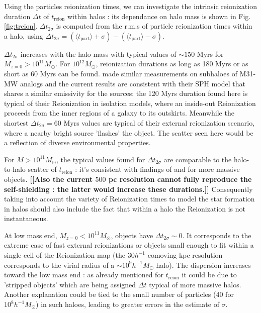\documentclass[twocolumn]{aastex61}
\newcommand{\dom}[1]{{\bf [[#1]]}}
\begin{document}
%

Using the particles reionization times, we can investigate the intrinsic reionization duration $\Delta t$ of $t_\mathrm{reion}$ within halos : its dependance on halo mass is shown in Fig. \ref{fig:treion}. $\Delta t_{2\sigma}$ is computed from the r.m.s of particle reionization times within a halo, using $\Delta t_{2\sigma}=(\langle t_\mathrm{part}\rangle+\sigma)-(\langle t_\mathrm{part}\rangle-\sigma)$. 

$\Delta t_{2\sigma}$ increases with the halo mass with typical values of $\sim 150$ Myrs for $M_{z=0}>10^{11} M_\odot$. For $10^{12} M_\odot$, reionization durations as long as 180 Myrs or as short as 60 Myrs can be found. \citet{OCV14} made similar measurements on subhaloes of M31-MW analogs and the current results are consistent with their SPH model that shares a similar emissivity for the sources: the 120 Myrs duration found here is typical of their Reionization in isolation models, where an inside-out Reionization proceeds from the inner regions of a galaxy to its outskirts. Meanwhile the shortest $\Delta t_{2\sigma}=60$ Myrs values are typical of their external reionization scenario, where a nearby bright source 'flashes' the object. The scatter seen here would be a reflection of diverse environmental properties.

For $M>10^{11} M_\odot$, the typical values found for $\Delta t_{2\sigma}$ are comparable to the halo-to-halo scatter of $t_\mathrm{reion}$ : it's consistent with findings of \citet{ALV9} and \citet{LI14} for more massive objects. \dom{Also the current $500$ pc resolution cannot fully reproduce the self-shielding : the latter would increase these durations.} Consequently taking into account the variety of Reionization times to model the star formation in halos should also include the fact that within a halo the Reionization is not instantaneous. 

At low mass end, $M_{z=0}<10^{11} M_\odot$, objects have $\Delta t_{2\sigma}\sim 0$. It corresponds to the extreme case of fast external reionizations or objects small enough to fit within a single cell of the Reionization map (the $30 h^{-1}$ comoving kpc resolution corresponds to the virial radius of a $\sim 10^9 h^{-1} M_\odot$ halo). The dispersion increases toward the low mass end : as already mentioned for $t_\mathrm{reion}$ it could be due to 'stripped objects' which are being assigned $\Delta t$ typical of more massive halos. Another explanation could be tied to the small number of particles (40 for $10^8 h^{-1} M_\odot$) in such haloes, leading to greater errors in the estimate of $\sigma$.
\end{document}
